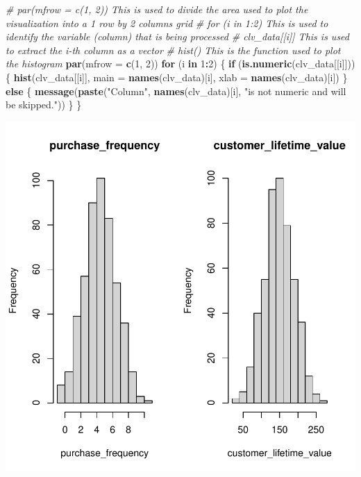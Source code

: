 \documentclass[
]{article}
\newenvironment{Shaded}{\begin{snugshade}}{\end{snugshade}}
\newcommand{\AttributeTok}[1]{\textcolor[rgb]{0.13,0.29,0.53}{#1}}
\newcommand{\CommentTok}[1]{\textcolor[rgb]{0.56,0.35,0.01}{\textit{#1}}}
\newcommand{\ControlFlowTok}[1]{\textcolor[rgb]{0.13,0.29,0.53}{\textbf{#1}}}
\newcommand{\DecValTok}[1]{\textcolor[rgb]{0.00,0.00,0.81}{#1}}
\newcommand{\FunctionTok}[1]{\textcolor[rgb]{0.13,0.29,0.53}{\textbf{#1}}}
\newcommand{\NormalTok}[1]{#1}
\newcommand{\SpecialCharTok}[1]{\textcolor[rgb]{0.81,0.36,0.00}{\textbf{#1}}}
\newcommand{\StringTok}[1]{\textcolor[rgb]{0.31,0.60,0.02}{#1}}
\begin{document}
\begin{Shaded}
\begin{Highlighting}[]
\CommentTok{\# \textasciigrave{}par(mfrow = c(1, 2))\textasciigrave{} This is used to divide the area used to plot the visualization into a 1 row by 2 columns grid}
\CommentTok{\# \textasciigrave{}for (i in 1:2)\textasciigrave{} This is used to identify the variable (column) that is being processed}
\CommentTok{\# \textasciigrave{}clv\_data[[i]]\textasciigrave{} This is used to extract the i{-}th column as a vector}
\CommentTok{\# \textasciigrave{}hist()\textasciigrave{} This is the function used to plot the histogram}
\FunctionTok{par}\NormalTok{(}\AttributeTok{mfrow =} \FunctionTok{c}\NormalTok{(}\DecValTok{1}\NormalTok{, }\DecValTok{2}\NormalTok{))}
\ControlFlowTok{for}\NormalTok{ (i }\ControlFlowTok{in} \DecValTok{1}\SpecialCharTok{:}\DecValTok{2}\NormalTok{) \{}
  \ControlFlowTok{if}\NormalTok{ (}\FunctionTok{is.numeric}\NormalTok{(clv\_data[[i]])) \{}
    \FunctionTok{hist}\NormalTok{(clv\_data[[i]],}
         \AttributeTok{main =} \FunctionTok{names}\NormalTok{(clv\_data)[i],}
         \AttributeTok{xlab =} \FunctionTok{names}\NormalTok{(clv\_data)[i])}
\NormalTok{  \} }\ControlFlowTok{else}\NormalTok{ \{}
    \FunctionTok{message}\NormalTok{(}\FunctionTok{paste}\NormalTok{(}\StringTok{"Column"}\NormalTok{, }\FunctionTok{names}\NormalTok{(clv\_data)[i], }\StringTok{"is not numeric and will be skipped."}\NormalTok{))}
\NormalTok{  \}}
\NormalTok{\}}
\end{Highlighting}
\end{Shaded}

\includegraphics{1_simple_linear_regression_files/figure-latex/visualization_histogram-1.pdf}
\end{document}
